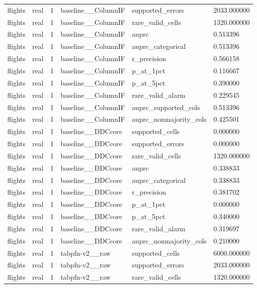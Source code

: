 \begin{tabular}{llllll}
flights & real & 1 & baseline\_\_ColumnIF & supported\_errors & 2033.000000 \\
flights & real & 1 & baseline\_\_ColumnIF & rare\_valid\_cells & 1320.000000 \\
flights & real & 1 & baseline\_\_ColumnIF & auprc & 0.513396 \\
flights & real & 1 & baseline\_\_ColumnIF & auprc\_categorical & 0.513396 \\
flights & real & 1 & baseline\_\_ColumnIF & r\_precision & 0.566158 \\
flights & real & 1 & baseline\_\_ColumnIF & p\_at\_1pct & 0.116667 \\
flights & real & 1 & baseline\_\_ColumnIF & p\_at\_5pct & 0.390000 \\
flights & real & 1 & baseline\_\_ColumnIF & rare\_valid\_alarm & 0.229545 \\
flights & real & 1 & baseline\_\_ColumnIF & auprc\_supported\_cols & 0.513396 \\
flights & real & 1 & baseline\_\_ColumnIF & auprc\_nonmajority\_cols & 0.425501 \\
flights & real & 1 & baseline\_\_DDCcore & supported\_cells & 0.000000 \\
flights & real & 1 & baseline\_\_DDCcore & supported\_errors & 0.000000 \\
flights & real & 1 & baseline\_\_DDCcore & rare\_valid\_cells & 1320.000000 \\
flights & real & 1 & baseline\_\_DDCcore & auprc & 0.338833 \\
flights & real & 1 & baseline\_\_DDCcore & auprc\_categorical & 0.338833 \\
flights & real & 1 & baseline\_\_DDCcore & r\_precision & 0.381702 \\
flights & real & 1 & baseline\_\_DDCcore & p\_at\_1pct & 0.000000 \\
flights & real & 1 & baseline\_\_DDCcore & p\_at\_5pct & 0.340000 \\
flights & real & 1 & baseline\_\_DDCcore & rare\_valid\_alarm & 0.319697 \\
flights & real & 1 & baseline\_\_DDCcore & auprc\_nonmajority\_cols & 0.210000 \\
flights & real & 1 & tabpfn-v2\_\_raw & supported\_cells & 6000.000000 \\
flights & real & 1 & tabpfn-v2\_\_raw & supported\_errors & 2033.000000 \\
flights & real & 1 & tabpfn-v2\_\_raw & rare\_valid\_cells & 1320.000000 \\

\end{tabular}
